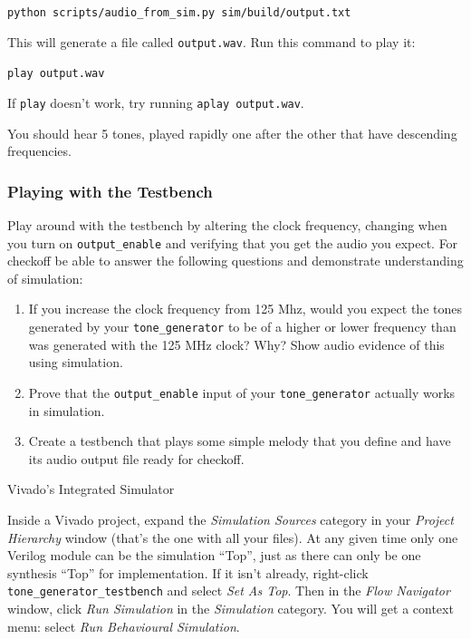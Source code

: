 \documentclass[11pt]{article}
\makeatletter
\renewcommand{\subsection}
{\@startsection {subsection}{1}{0pt}
 {-1ex}
 {0.5ex}
 {\bfseries\normalsize}}
\makeatother
\begin{document}
\verb|python scripts/audio_from_sim.py sim/build/output.txt|

This will generate a file called \verb|output.wav|. Run this command to play it:

\verb|play output.wav|

If \verb|play| doesn't work, try running \verb|aplay output.wav|.

You should hear 5 tones, played rapidly one after the other that have descending frequencies.

\subsubsection{Playing with the Testbench} \label{checkoff:0}

Play around with the testbench by altering the clock frequency, changing when you turn on \verb|output_enable| and verifying that you get the audio you expect. For checkoff be able to answer the following questions and demonstrate understanding of simulation:

\begin{enumerate}
	\item If you increase the clock frequency from 125 Mhz, would you expect the tones generated by your \verb|tone_generator| to be of a higher or lower frequency than was generated with the 125 MHz clock? Why? Show audio evidence of this using simulation.
	\item Prove that the \verb|output_enable| input of your \verb|tone_generator| actually works in simulation.
	\item Create a testbench that plays some simple melody that you define and have its audio output file ready for checkoff.
\end{enumerate}

\subsection{Vivado's Integrated Simulator}

Inside a Vivado project, expand the \emph{Simulation Sources} category in your \emph{Project Hierarchy} window (that's the one with all your files). At any given time only one Verilog module can be the simulation ``Top'', just as there can only be one synthesis ``Top'' for implementation. If it isn't already, right-click \verb|tone_generator_testbench| and select \emph{Set As Top}. Then in the \emph{Flow Navigator} window, click \emph{Run Simulation} in the \emph{Simulation} category. You will get a context menu: select \emph{Run Behavioural Simulation}.
\end{document}
